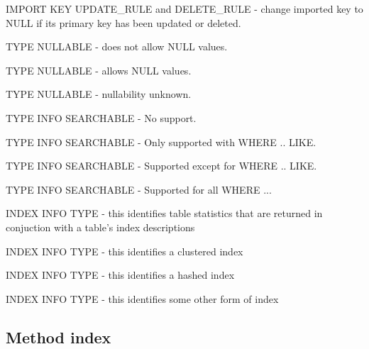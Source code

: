 IMPORT KEY UPDATE\_RULE and DELETE\_RULE - change imported key to NULL if its primary key has been updated or deleted. 

TYPE NULLABLE - does not allow NULL values. 

TYPE NULLABLE - allows NULL values. 

TYPE NULLABLE - nullability unknown. 

TYPE INFO SEARCHABLE - No support. 

TYPE INFO SEARCHABLE - Only supported with WHERE .. LIKE. 

TYPE INFO SEARCHABLE - Supported except for WHERE .. LIKE. 

TYPE INFO SEARCHABLE - Supported for all WHERE ... 

INDEX INFO TYPE - this identifies table statistics that are returned in conjuction with a table's index descriptions 

INDEX INFO TYPE - this identifies a clustered index 

INDEX INFO TYPE - this identifies a hashed index 

INDEX INFO TYPE - this identifies some other form of index 


\subsection{Method index}

